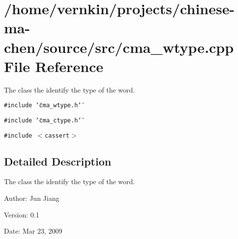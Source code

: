 \section{/home/vernkin/projects/chinese-ma-chen/source/src/cma\_\-wtype.cpp File Reference}
\label{cma__wtype_8cpp}
The class the identify the type of the word.  


{\tt \#include \char`\"{}cma\_\-wtype.h\char`\"{}}\par
{\tt \#include \char`\"{}cma\_\-ctype.h\char`\"{}}\par
{\tt \#include $<$cassert$>$}\par


\subsection{Detailed Description}
The class the identify the type of the word. 

\begin{Desc}
\item[Author:]Jun Jiang \end{Desc}
\begin{Desc}
\item[Version:]0.1 \end{Desc}
\begin{Desc}
\item[Date:]Mar 23, 2009 \end{Desc}
